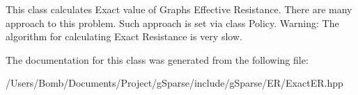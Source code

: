 This class calculates Exact value of Graph\textquotesingle{}s Effective Resistance. There are many approach to this problem. Such approach is set via class Policy. Warning\+: The algorithm for calculating Exact Resistance is very slow. 

The documentation for this class was generated from the following file\+:\begin{DoxyCompactItemize}
\item 
/\+Users/\+Bomb/\+Documents/\+Project/g\+Sparse/include/g\+Sparse/\+E\+R/Exact\+E\+R.\+hpp\end{DoxyCompactItemize}
